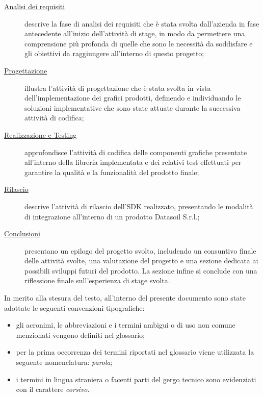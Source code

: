 \begin{description}
      \item[{\hyperref[chap:analisi-requisiti]{Analisi dei requisiti}}] descrive la fase di analisi dei requisiti che è stata
            svolta dall'azienda in fase antecedente all'inizio dell'attività di stage, in modo da permettere una comprensione più profonda
            di quelle che sono le necessità da soddisfare e gli obiettivi da raggiungere all'interno di questo progetto;

      \item[{\hyperref[chap:progettazione]{Progettazione}}] illustra l'attività di progettazione che è stata svolta in vista dell'implementazione
            dei grafici prodotti, definendo e individuando le soluzioni implementative che sono state attuate durante la successiva attività di codifica;

      \item[{\hyperref[chap:realizzazione-testing]{Realizzazione e Testing}}] approfondisce l'attività di codifica delle componenti grafiche presentate
            all'interno della libreria implementata e dei relativi test effettuati per garantire la qualità e la funzionalità del prodotto finale;

      \item[{\hyperref[chap:rilascio]{Rilascio}}] descrive l'attività di rilascio dell'SDK realizzato, presentando le modalità di integrazione
            all'interno di un prodotto Datasoil S.r.l.;

      \item[{\hyperref[chap:conclusioni]{Conclusioni}}] presentano un epilogo del progetto svolto, includendo un consuntivo finale delle attività svolte,
            una valutazione del progetto e una sezione dedicata ai possibili sviluppi futuri del prodotto.
            La sezione infine si conclude con una riflessione finale sull'esperienza di stage svolta.
\end{description}
In merito alla stesura del testo, all'interno del presente documento sono state adottate le seguenti convenzioni tipografiche:
\begin{itemize}
      \item gli acronimi, le abbreviazioni e i termini ambigui o di uso non comune menzionati vengono definiti nel glossario;
      \item per la prima occorrenza dei termini riportati nel glossario viene utilizzata la seguente nomenclatura: \textit{parola}\glox\gloxspacing;
      \item i termini in lingua straniera o facenti parti del gergo tecnico sono evidenziati con il carattere \textit{corsivo}.
\end{itemize}

